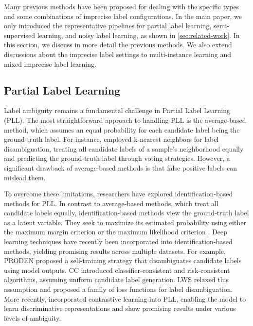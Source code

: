 Many previous methods have been proposed for dealing with the specific types and some combinations of imprecise label configurations. In the main paper, we only introduced the representative pipelines for partial label learning, semi-supervised learning, and noisy label learning, as shown in \cref{sec:related-work}. In this section, we discuss in more detail the previous methods. We also extend discussions about the imprecise label settings to multi-instance learning and mixed imprecise label learning. 

\subsection{Partial Label Learning}


Label ambiguity remains a fundamental challenge in Partial Label Learning (PLL). 
The most straightforward approach to handling PLL is the average-based method, which assumes an equal probability for each candidate label being the ground-truth label. For instance, \citet{hullermeier2006learning} employed k-nearest neighbors for label disambiguation, treating all candidate labels of a sample's neighborhood equally and predicting the ground-truth label through voting strategies. 
However, a significant drawback of average-based methods is that false positive labels can mislead them.

To overcome these limitations, researchers have explored identification-based methods for PLL. In contrast to average-based methods, which treat all candidate labels equally, identification-based methods view the ground-truth label as a latent variable. They seek to maximize its estimated probability using either the maximum margin criterion \citep{nguyen2008classification,zhang2016partial} or the maximum likelihood criterion \citep{liu2012conditional}.
Deep learning techniques have recently been incorporated into identification-based methods, yielding promising results across multiple datasets. For example, PRODEN \citep{lv2020progressive} proposed a self-training strategy that disambiguates candidate labels using model outputs. CC \citep{Feng2020ProvablyCP} introduced classifier-consistent and risk-consistent algorithms, assuming uniform candidate label generation. LWS \citep{wen2021leveraged} relaxed this assumption and proposed a family of loss functions for label disambiguation. More recently, \citet{wang2022pico} incorporated contrastive learning into PLL, enabling the model to learn discriminative representations and show promising results under various levels of ambiguity.

